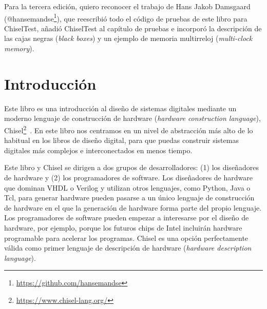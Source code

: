 \documentclass[%
    10pt,
    headinclude, footinclude=false,
    openright, %
    notitlepage,
    cleardoublepage=empty,
    headsepline,
    numbers=noenddot,
    bibliography=totoc, index=totoc,
    ]{scrbook}
\newcommand{\myref}[2]{\href{#1}{#2}}
\renewcommand{\myref}[2]{{#2}{\footnote{\url{#1}}}}
\begin{document}

Para la tercera edición, quiero reconocer el trabajo de Hans Jakob Damsgaard (\myref{https://github.com/hansemandse}{@hansemandse}), 
que reescribió todo el código de pruebas de este libro para ChiselTest, añadió ChiselTest al capítulo de pruebas e incorporó la 
descripción de las cajas negras (\emph{black boxes}) y un ejemplo de memoria multirreloj (\emph{multi-clock memory}).

\mainmatter

\chapter{Introducción}
\label{sec:intro}


Este libro es una introducción al diseño de sistemas digitales mediante un moderno lenguaje de construcción de hardware 
(\emph{hardware construction language}), \myref{https://www.chisel-lang.org/}{Chisel}~\cite{chisel:dac2012}.
En este libro nos centramos en un nivel de abstracción más alto de lo habitual en los libros de diseño digital, para que puedas 
construir sistemas digitales más complejos e interconectados en menos tiempo.


Este libro y Chisel se dirigen a dos grupos de desarrolladores:
(1) los diseñadores de hardware y (2) los programadores de software.
Los diseñadores de hardware que dominan VHDL o Verilog y utilizan otros lenguajes, como Python,
Java o Tcl, para generar hardware pueden pasarse a un único lenguaje de construcción de hardware
en el que la generación de hardware forma parte del propio lenguaje.
Los programadores de software pueden empezar a interesarse por el diseño de hardware,
por ejemplo, porque los futuros chips de Intel incluirán hardware programable para acelerar los programas.
Chisel es una opción perfectamente válida como primer lenguaje de descripción de hardware (\emph{hardware description language}).
\end{document}
